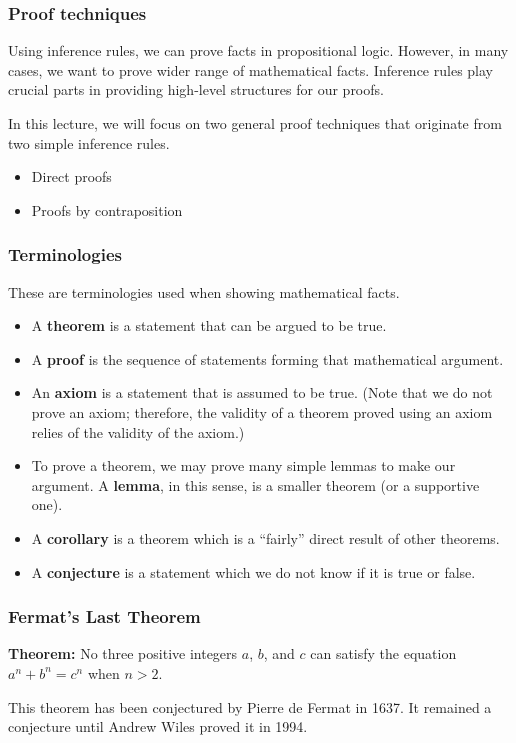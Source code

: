 

\begin{frame}\frametitle{Proof techniques}
  Using inference rules, we can prove facts in propositional logic.
  However, in many cases, we want to prove wider range of mathematical
  facts.  Inference rules play crucial parts in providing high-level
  structures for our proofs. \pause

  In this lecture, we will focus on two general proof techniques that
  originate from two simple inference rules.
  \begin{itemize}
  \item Direct proofs
  \item Proofs by contraposition
  \end{itemize}
\end{frame}

\begin{frame}\frametitle{Terminologies}
  These are terminologies used when showing mathematical facts.
  \begin{itemize}
  \item A {\bf theorem} is a statement that can be argued to be true.
  \item A {\bf proof} is the sequence of statements forming that
    mathematical argument.
    \pause
  \item An {\bf axiom} is a statement that is assumed to be true.
    (Note that we do not prove an axiom; therefore, the validity of a
    theorem proved using an axiom relies of the validity of the
    axiom.)
    \pause
  \item To prove a theorem, we may prove many simple lemmas to make
    our argument.  A {\bf lemma}, in this sense, is a smaller theorem
    (or a supportive one).
    \pause
  \item A {\bf corollary} is a theorem which is a ``fairly'' direct
    result of other theorems.
    \pause
  \item A {\bf conjecture} is a statement which we do not know if it
    is true or false.
  \end{itemize}
\end{frame}

\begin{frame}\frametitle{Fermat's Last Theorem}
  \begin{tcolorbox}
    {\bf Theorem:} No three positive integers $a$, $b$, and $c$ can satisfy the equation $a^n+b^n=c^n$ when $n>2$.
  \end{tcolorbox}

  This theorem has been conjectured by Pierre de Fermat in 1637.  It
  remained a conjecture until Andrew Wiles proved it in 1994.
\end{frame}

